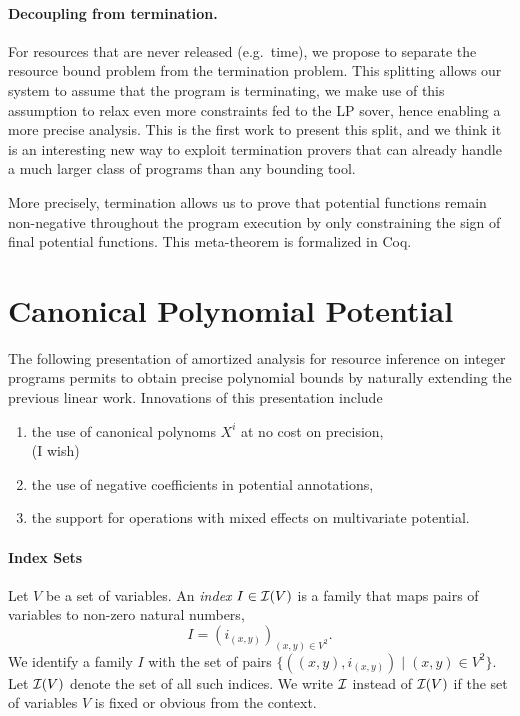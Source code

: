 \documentclass[nocopyrightspace,preprint]{sigplanconf-pldi15}
\begin{document}
\paragraph{Decoupling from termination.}
For resources that are never released (e.g.\ time), we
propose to separate the resource bound problem from the
termination problem.  This splitting allows our system
to assume that the program is terminating, we make use
of this assumption to relax even more constraints fed
to the LP sover, hence enabling a more precise analysis.
%
This is the first work to present this split, and we
think it is an interesting new way to exploit termination
provers that can already handle a much larger class of
programs than any bounding tool.

More precisely, termination allows us to prove that
potential functions remain non-negative throughout
the program execution by only constraining the sign of
final potential functions.  This meta-theorem is
formalized in Coq.


\section{Canonical Polynomial Potential}

The following presentation of amortized analysis for resource
inference on integer programs permits to obtain precise polynomial
bounds by naturally extending the previous linear work. Innovations
of this presentation include
\begin{enumerate}
\item the use of canonical polynoms $X^i$ at no cost on precision,
 \\ (I wish)
\item the use of negative coefficients in potential annotations,
\item the support for operations with mixed effects on multivariate potential.
\end{enumerate}

\paragraph{Index Sets}

Let $V$ be a set of variables.  An \emph{index} $I \in \mathcal{I}(V)$ is a
family that maps pairs of variables to non-zero natural numbers,
$$
I = (i_{(x,y)})_{(x,y) \in V^2} .
$$
%
We identify a family $I$ with the set of pairs $\{ ((x,y),i_{(x,y)})
\mid (x,y) \in V^2\}$.
Let $\mathcal{I}(V)$ denote the set of all such indices.  We write $\mathcal{I}$
instead of $\mathcal{I}(V)$ if the set of variables $V$ is fixed or obvious
from the context.
%
\end{document}
